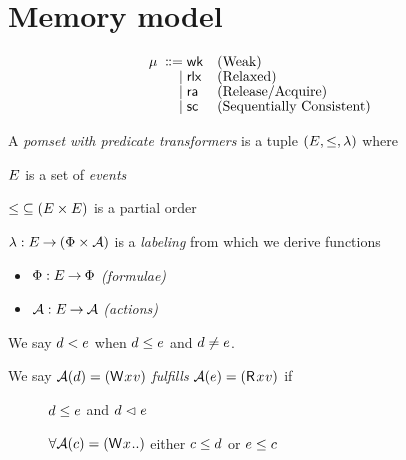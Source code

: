 \section{Memory model}


\begin{align*}
  \mu \;\mathrel{\mathord{\vcentcolon}\mkern-1mu\mathord{\vcentcolon}\mathord{{=}}}\;& {\mathsf{wk}} &&\text{{(Weak)}}
  \\[-1ex] \;\mathrel{|}\;& {\mathsf{rlx}} &&\text{{(Relaxed)}}
  \\[-1ex] \;\mathrel{|}\;& {\mathsf{ra}} &&\text{{(Release/Acquire)}}
  \\[-1ex] \;\mathrel{|}\;& {\mathsf{sc}} &&\text{{(Sequentially Consistent)}}    
\end{align*}

\begin{definition}
  A \emph{pomset with predicate transformers} is a tuple
  $(E, {\le}, \lambda)$ where
  \begin{description}
  \item $E$ is a set of \emph{events}
  \item
    ${\le} \subseteq (E\times E)$ is a partial order
  \item
    $\lambda: E \mathbin\rightarrow (\Phi\times\mathcal{A})$ is a \emph{labeling} from
    which we derive functions
    \begin{itemize}
    \item $\Phi:E\mathbin\rightarrow\Phi$
      \emph{(formulae)} %
    \item $\mathcal{A}:E\mathbin\rightarrow\mathcal{A}$
      \emph{(actions)} %
    \end{itemize}
  \end{description}
\end{definition}
We say $d<e$ when $d\le e$ and $d\neq e$.
\begin{definition}
  We say $\labelingAct(\bEv)=(\DW[]{x}{v})$ \emph{fulfills}
  $\labelingAct(\aEv)=(\DR[]{x}{v})$ if
  \begin{description}
  \item[{}] $d \le e$ and
    $d \vartriangleleft e$
  \item[{}]
    $\forall\labelingAct(\cEv)=(\DW[]{x}{..})$ either $c \le d$ or
    $e \le c$
  \end{description}  
\end{definition}

